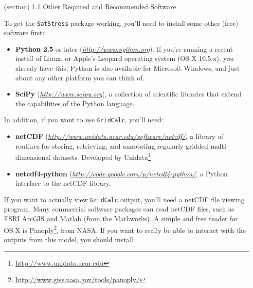   (section) 1.1 Other Required and Recommended Software

    To get the \texttt{SatStress} package working, you'll need to install 
    some other (free) software first:

    \begin{itemize}
    \setlength{\parskip}{0.6ex}
      \item \textbf{Python 2.5} or later 
        (\href{http://www.python.org}{\textit{http://www.python.org}}).  If
        you're running a recent install of Linux, or Apple's Leopard 
        operating system (OS X 10.5.x), you already have this.  Python is 
        also available for Microsoft Windows, and just about any other 
        platform you can think of.

      \item \textbf{SciPy} 
        (\href{http://www.scipy.org}{\textit{http://www.scipy.org}}), a 
        collection of scientific libraries that extend the capabilities of 
        the Python language.

    \end{itemize}

    In addition, if you want to use \texttt{GridCalc}, you'll need:

    \begin{itemize}
    \setlength{\parskip}{0.6ex}
      \item \textbf{netCDF} 
        (\href{http://www.unidata.ucar.edu/software/netcdf/}{\textit{http://www.unidata.ucar.edu/software/netcdf/}},
        a library of routines for storing, retrieving, and annotating 
        regularly gridded multi-dimensional datasets.  Developed by 
        Unidata\footnote{\href{http://www.unidata.ucar.edu}{http://www.unidata.ucar.edu}}

      \item \textbf{netcdf4-python} 
        (\href{http://code.google.com/p/netcdf4-python/}{\textit{http://code.google.com/p/netcdf4-python/}},
        a Python interface to the netCDF library.

    \end{itemize}

    If you want to actually view \texttt{GridCalc} output, you'll need a 
    netCDF file viewing program.  Many commercial software packages can 
    read netCDF files, such as ESRI ArcGIS and Matlab (from the Mathworks).
    A simple and free reader for OS X is 
    Panoply\footnote{\href{http://www.giss.nasa.gov/tools/panoply/}{http://www.giss.nasa.gov/tools/panoply/}},
    from NASA.  If you want to really be able to interact with the outputs 
    from this model, you should install:

